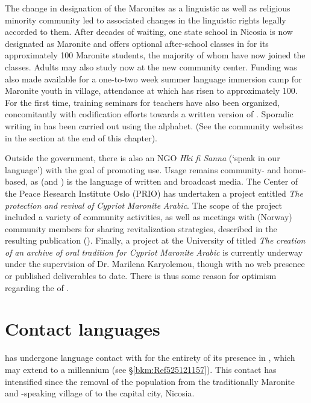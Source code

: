 \documentclass[output=paper]{langsci/langscibook}
\begin{document}
The change in designation of the  Maronites as a linguistic as well as religious minority community led to associated changes in the linguistic rights legally accorded to them. After decades of waiting, one state school in Nicosia is now designated as Maronite and offers optional after-school classes in  for its approximately 100 Maronite students, the majority of whom have now joined the classes. Adults may also study  now at the new community center. Funding was also made available for a one-to-two week summer language immersion camp for Maronite youth in  village, attendance at which has risen to approximately 100. For the first time, training seminars for teachers have also been organized, concomitantly with codification efforts towards a written version of . Sporadic writing in  has been carried out using the  alphabet. (See the community websites in the  section at the end of this chapter).


Outside the government, there is also an NGO \textit{Hki fi Sanna} (‘speak in our language’) with the goal of promoting  use. Usage remains community- and home-based, as   (and ) is the language of written and broadcast media. The  Center of the Peace Research Institute Oslo (PRIO) has undertaken a project entitled \textit{The} \textit{protection} \textit{and} \textit{revival} \textit{of} \textit{Cypriot} \textit{Maronite} \textit{Arabic}. The scope of the project included a variety of community activities, as well as meetings with  (Norway) community members for sharing revitalization strategies, described in the resulting publication (\citealt{PRIO2009}). Finally, a project at the University of  titled \textit{The} \textit{creation} \textit{of} \textit{an} \textit{archive} \textit{of} \textit{oral} \textit{tradition} \textit{for} \textit{Cypriot} \textit{Maronite} \textit{Arabic} is currently underway under the supervision of Dr. Marilena Karyolemou, though with no web presence or published deliverables to date. There is thus some reason for optimism regarding the  of .

\section{\label{bkm:Ref525122525}Contact languages}


 has undergone  language contact with   for the entirety of its presence in , which may extend to a millennium (see §\ref{bkm:Ref525121157}). This contact has intensified since the removal of the population from the traditionally Maronite and -speaking village of  to the capital city, Nicosia.
\end{document}
